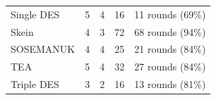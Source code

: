 \documentclass[aspectratio=169]{beamer}
\newcommand{\gr}{\cellcolor{green!40}}
\begin{document}
\begin{frame}
\begin{table}
\begin{nomar}
{\begin{tabular}{@{}lrrrr@{}}
Single DES         & \gr5               & 4                        & 16                    &    11 rounds (69\%)        \\
Skein              & \gr4               & 3                        & 72                    &    68 rounds (94\%)        \\
SOSEMANUK          &    4               & 4                        & 25                    &    21 rounds (84\%)        \\
TEA                & \gr5               & 4                        & 32                    &    27 rounds (84\%)        \\
Triple DES         & \gr3               & 2                        & 16                    &    13 rounds (81\%)        \\ \bottomrule
\end{tabular}
}
\end{nomar}
\end{table}
\end{frame}
\end{document}
